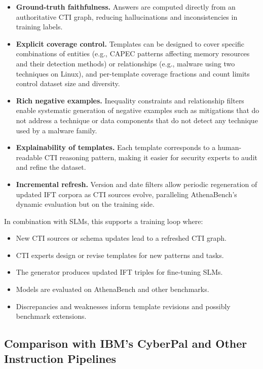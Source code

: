 \documentclass[sigconf]{acmart}
\begin{document}
\begin{itemize}
  \item \textbf{Ground-truth faithfulness.} Answers are computed directly from an authoritative CTI graph, reducing hallucinations and inconsistencies in training labels.
  \item \textbf{Explicit coverage control.} Templates can be designed to cover specific combinations of entities (e.g., CAPEC patterns affecting memory resources and their detection methods) or relationships (e.g., malware using two techniques on Linux), and per-template coverage fractions and count limits control dataset size and diversity.\cite{cardei2025ift}
  \item \textbf{Rich negative examples.} Inequality constraints and relationship filters enable systematic generation of negative examples such as mitigations that do not address a technique or data components that do not detect any technique used by a malware family.
  \item \textbf{Explainability of templates.} Each template corresponds to a human-readable CTI reasoning pattern, making it easier for security experts to audit and refine the dataset.
  \item \textbf{Incremental refresh.} Version and date filters allow periodic regeneration of updated IFT corpora as CTI sources evolve, paralleling AthenaBench's dynamic evaluation but on the training side.\cite{cardei2025ift,alam2025athenabench}
\end{itemize}

In combination with SLMs, this supports a training loop where:

\begin{itemize}
  \item New CTI sources or schema updates lead to a refreshed CTI graph.
  \item CTI experts design or revise templates for new patterns and tasks.
  \item The generator produces updated IFT triples for fine-tuning SLMs.
  \item Models are evaluated on AthenaBench and other benchmarks.
  \item Discrepancies and weaknesses inform template revisions and possibly benchmark extensions.
\end{itemize}

\subsection{Comparison with IBM's CyberPal and Other Instruction Pipelines}
\end{document}
